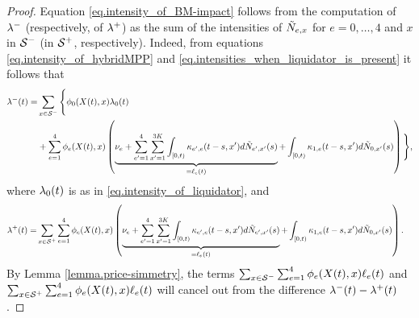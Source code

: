 \documentclass[10pt]{article}
\begin{document}
\begin{proof}
 Equation \eqref{eq.intensity_of_BM-impact} follows from the computation of $\intensityDeflationary$ (respectively, of $\intensityInflationary$) as the sum of the intensities of $\hybridHawkes_{e,x}$ for $e = 0,\dots,4$ and $x$ in $\deflationarySpace$ (in $\inflationarySpace$, respectively). Indeed, from equations \eqref{eq.intensity_of_hybridMPP} and \eqref{eq.intensities_when_liquidator_is_present} it follows that 
 \begin{equation*}
 \begin{split}
  \intensityDeflationary(t) 
  =&
  \sum_{x\in\deflationarySpace}\Bigg\lbrace
  \transProb_{0}(\stateVariable(t),x) \intensity[0](t)
  \\
  &  +
  \sum_{e=1}^{4} \transProb_{e}(\stateVariable(t),x) 
  \left(
  \underbrace{
  \baseRate_e 
 + \sum_{\eone = 1}^{4}\sum_{\xone=1}^{3K}\int_{[0,t)} \hawkesKernel_{\eone,e}(t-s,\xone)d\hybridHawkes_{\eone,\xone}(s)
 }_{=\ell_{e}(t)}
 + \int_{[0,t)} \hawkesKernel_{1,e}(t-s,\xone)d\hybridHawkes_{0,\xone}(s)
 \right)
  \Bigg\rbrace,
  \\
  \end{split}
 \end{equation*}
 where $\intensity[0](t)$ is as in \eqref{eq.intensity_of_liquidator}, and 
 \begin{equation*}
 \begin{split}
  \intensityInflationary(t) 
  =&
  \sum_{x\in\inflationarySpace}
  \sum_{e=1}^{4} \transProb_{e}(\stateVariable(t),x) 
  \left(
  \underbrace{
  \baseRate_e 
 + \sum_{\eone = 1}^{4}\sum_{\xone=1}^{3K}\int_{[0,t)} \hawkesKernel_{\eone,e}(t-s,\xone)d\hybridHawkes_{\eone,\xone}(s)
 }_{=\ell_{e}(t)}
 + \int_{[0,t)} \hawkesKernel_{1,e}(t-s,\xone)d\hybridHawkes_{0,\xone}(s)
 \right).
   \end{split}
 \end{equation*}
 By Lemma \ref{lemma.price-simmetry}, the terms $\sum_{x\in\deflationarySpace}\sum_{e=1}^{4}\transProb_{e}(\stateVariable(t),x) \ell_{e}(t)$ and $\sum_{x\in\inflationarySpace}\sum_{e=1}^{4}\transProb_{e}(\stateVariable(t),x) \ell_{e}(t)$ will  cancel out from the difference $\intensityDeflationary(t) - \intensityInflationary(t)$. 
 \end{proof}
 
\end{document}
